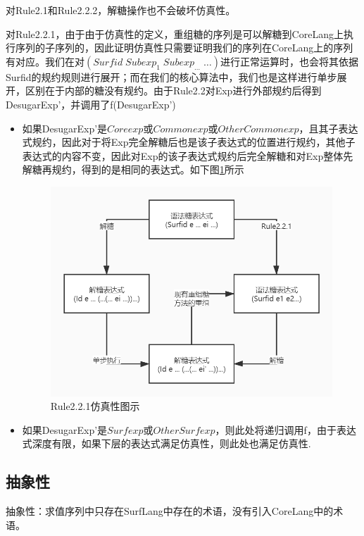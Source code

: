 
对Rule2.1和Rule2.2.2，解糖操作也不会破坏仿真性。

对Rule2.2.1，由于由于仿真性的定义，重组糖的序列是可以解糖到CoreLang上执行序列的子序列的，因此证明仿真性只需要证明我们的序列在CoreLang上的序列有对应。我们在对$(Surfid\;Subexp_{1}\;Subexp_{\ldots}\;\ldots)$进行正常运算时，也会将其依据Surfid的规约规则进行展开；而在我们的核心算法中，我们也是这样进行单步展开，区别在于内部的糖没有规约。由于Rule2.2对Exp进行外部规约后得到DesugarExp'，并调用了f(DesugarExp')
\begin{itemize}
	\item 如果DesugarExp'是$Coreexp$或$Commonexp$或$OtherCommonexp$，且其子表达式规约，因此对于将Exp完全解糖后也是该子表达式的位置进行规约，其他子表达式的内容不变，因此对Exp的该子表达式规约后完全解糖和对Exp整体先解糖再规约，得到的是相同的表达式。如下图\ref{fig:emulation}所示
	
	\begin{figure}[h]
		\centering
		\includegraphics[width=12cm]{images/chapter3/flowgraph.jpg}
		\caption{Rule2.2.1仿真性图示}
		\label{fig:emulation}
	\end{figure}

	\item 如果DesugarExp'是$Surfexp$或$OtherSurfexp$，则此处将递归调用f，由于表达式深度有限，如果下层的表达式满足仿真性，则此处也满足仿真性.
\end{itemize}


\subsection{抽象性}
抽象性：求值序列中只存在SurfLang中存在的术语，没有引入CoreLang中的术语。


